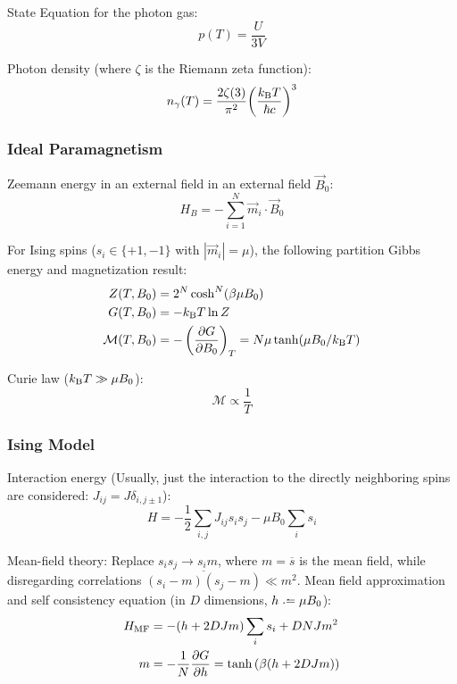 			\noindent
			State Equation for the photon gas:
			\begin{equation}
				p(T) = \frac{U}{3V}
			\end{equation}

			\noindent
			Photon density (where $\zeta$ is the Riemann zeta function):
			\begin{equation}
				n_\gamma(T) = \frac{2\zeta(3)}{\pi^2} \qty(\frac{k_{\text{B}} T}{\hbar c})^3
			\end{equation}

		\subsubsection{Ideal Paramagnetism}
			\noindent
			Zeemann energy in an external field in an external field $\vec{B}_0$:
			\begin{equation}
				H_B = -\sum_{i=1}^N \vec{m}_i \cdot \vec{B}_0
			\end{equation}

			\noindent
			For Ising spins ($s_i\in\lbrace +1, -1\rbrace$ with $|\vec{m}_i| = \mu$), the following partition Gibbs energy and magnetization result:
			\begin{equation}
				\begin{aligned}
					Z(T,B_0) &= 2^N \cosh^N (\beta\mu B_0) \\
					G(T,B_0) &= -k_{\text{B}} T \ln Z \\
					\mathcal{M}(T,B_0) &= -\left(\pdv{G}{B_0}\right)_T = N\mu \tanh(\mu B_0 /k_{\text{B}} T)
				\end{aligned}
			\end{equation}

			\noindent
			Curie law ($k_{\text{B}} T \gg \mu B_0$):
			\begin{equation}
				\mathcal{M} \propto \frac{1}{T}
			\end{equation}

		\subsubsection{Ising Model}
			\noindent
			Interaction energy (Usually, just the interaction to the directly neighboring spins are considered: $J_{ij} = J \delta_{i,j\pm 1}$):
			\begin{equation}
				H = -\frac{1}{2}\sum_{i,j} J_{ij} s_i s_j -\mu B_0 \sum_i s_i
			\end{equation}

			\noindent
			Mean-field theory: \newline
			Replace $s_i s_j \to s_i m$, where $m = \overline{s}$ is the mean field, while disregarding correlations $\overline{(s_i-m)(s_j-m)}\ll m^2$. \nl
			Mean field approximation and self consistency equation (in $D$ dimensions, $h\defeq \mu B_0$):
			\begin{equation}
				\begin{aligned}
					H_\text{MF} &= -(h + 2 D J m) \sum_i s_i + D N J m^2 \\
					m &= -\frac{1}{N}\pdv{G}{h} = \tanh\left({\beta(h + 2 D J m)}\right)
				\end{aligned}
			\end{equation}
